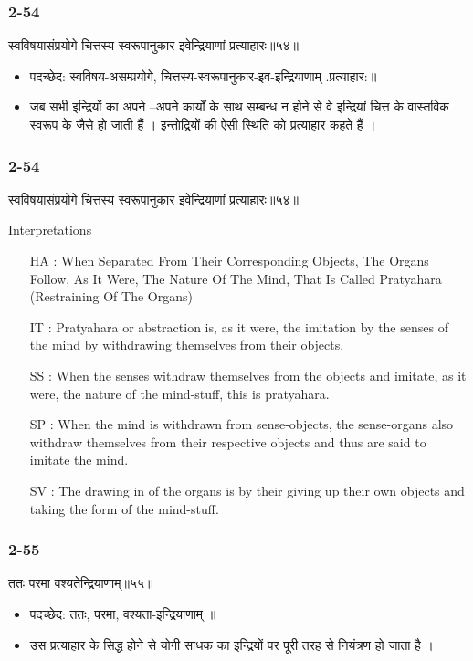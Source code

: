 \begin{frame}[fragile]\frametitle{2-54}
\begin{sanskrit}
स्वविषयासंप्रयोगे चित्तस्य स्वरूपानुकार इवेन्द्रियाणां प्रत्याहारः॥५४॥
\end{sanskrit}

\begin{itemize}
\item पदच्छेद: स्वविषय-असम्प्रयोगे, चित्तस्य-स्वरूपानुकार-इव-इन्द्रियाणाम् .प्रत्याहार:॥
\item जब सभी इन्द्रियों का अपने –अपने कार्यों के साथ सम्बन्ध न होने से वे इन्द्रियां चित्त के वास्तविक स्वरूप के जैसे हो जाती हैं । इन्तोद्रियों की ऐसी स्थिति को प्रत्याहार कहते हैं ।
\end{itemize}	
\end{frame}

\begin{frame}[fragile]\frametitle{2-54}
\begin{sanskrit}
स्वविषयासंप्रयोगे चित्तस्य स्वरूपानुकार इवेन्द्रियाणां प्रत्याहारः॥५४॥
\end{sanskrit}

Interpretations
\begin{itemize}
\item [HA]: When Separated From Their Corresponding Objects, The Organs Follow, As It Were, The Nature Of The Mind, That Is Called Pratyahara (Restraining Of The Organs)
\item [IT]: Pratyahara or abstraction is, as it were, the imitation by the senses of the mind by withdrawing themselves from their objects.
\item [SS]: When the senses withdraw themselves from the objects and imitate, as it were, the nature of the mind-stuff, this is pratyahara.
\item [SP]: When the mind is withdrawn from sense-objects, the sense-organs also withdraw themselves from their respective objects and thus are said to imitate the mind.
\item [SV]: The drawing in of the organs is by their giving up their own objects and taking the form of the mind-stuff.
\end{itemize}
\end{frame}

\begin{frame}[fragile]\frametitle{2-55}
\begin{sanskrit}
ततः परमा वश्यतेन्द्रियाणाम्॥५५॥
\end{sanskrit}

\begin{itemize}
\item पदच्छेद: ततः, परमा, वश्यता-इन्द्रियाणाम् ॥
\item उस प्रत्याहार के सिद्ध होने से योगी साधक का इन्द्रियों पर पूरी तरह से नियंत्रण हो जाता है ।
\end{itemize}	
\end{frame}

